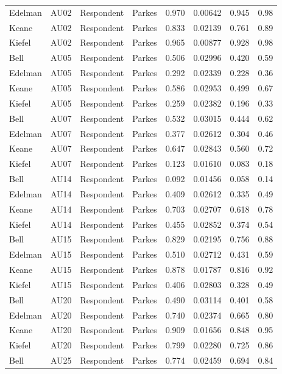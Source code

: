 \documentclass{monashthesis}
\begin{document}
\begin{center}
\begin{longtable}{llllllll}
Edelman & AU02 & Respondent & Parkes & 0.970 & 0.00642 & 0.945 & 0.98 \\
Keane & AU02 & Respondent & Parkes & 0.833 & 0.02139 & 0.761 & 0.89 \\
Kiefel & AU02 & Respondent & Parkes & 0.965 & 0.00877 & 0.928 & 0.98 \\
Bell & AU05 & Respondent & Parkes & 0.506 & 0.02996 & 0.420 & 0.59 \\
Edelman & AU05 & Respondent & Parkes & 0.292 & 0.02339 & 0.228 & 0.36 \\
Keane & AU05 & Respondent & Parkes & 0.586 & 0.02953 & 0.499 & 0.67 \\
Kiefel & AU05 & Respondent & Parkes & 0.259 & 0.02382 & 0.196 & 0.33 \\
Bell & AU07 & Respondent & Parkes & 0.532 & 0.03015 & 0.444 & 0.62 \\
Edelman & AU07 & Respondent & Parkes & 0.377 & 0.02612 & 0.304 & 0.46 \\
Keane & AU07 & Respondent & Parkes & 0.647 & 0.02843 & 0.560 & 0.72 \\
Kiefel & AU07 & Respondent & Parkes & 0.123 & 0.01610 & 0.083 & 0.18 \\
Bell & AU14 & Respondent & Parkes & 0.092 & 0.01456 & 0.058 & 0.14 \\
Edelman & AU14 & Respondent & Parkes & 0.409 & 0.02612 & 0.335 & 0.49 \\
Keane & AU14 & Respondent & Parkes & 0.703 & 0.02707 & 0.618 & 0.78 \\
Kiefel & AU14 & Respondent & Parkes & 0.455 & 0.02852 & 0.374 & 0.54 \\
Bell & AU15 & Respondent & Parkes & 0.829 & 0.02195 & 0.756 & 0.88 \\
Edelman & AU15 & Respondent & Parkes & 0.510 & 0.02712 & 0.431 & 0.59 \\
Keane & AU15 & Respondent & Parkes & 0.878 & 0.01787 & 0.816 & 0.92 \\
Kiefel & AU15 & Respondent & Parkes & 0.406 & 0.02803 & 0.328 & 0.49 \\
Bell & AU20 & Respondent & Parkes & 0.490 & 0.03114 & 0.401 & 0.58 \\
Edelman & AU20 & Respondent & Parkes & 0.740 & 0.02374 & 0.665 & 0.80 \\
Keane & AU20 & Respondent & Parkes & 0.909 & 0.01656 & 0.848 & 0.95 \\
Kiefel & AU20 & Respondent & Parkes & 0.799 & 0.02280 & 0.725 & 0.86 \\
Bell & AU25 & Respondent & Parkes & 0.774 & 0.02459 & 0.694 & 0.84 \\

\end{longtable}
\end{center}
\end{document}
